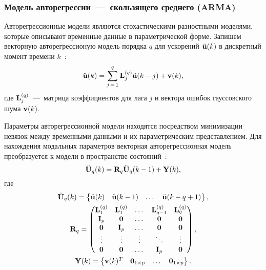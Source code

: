 \subsubsection{Модель авторегрессии~---~скользящего среднего (ARMA)}

Авторегрессионные модели являются стохастическими разностными моделями, которые описывают временные данные в параметрической форме. Запишем векторную авторегрессионую модель порядка $ q $ для ускорений $ \ddot{\mathbf{u}}(k) $ в дискретный момент времени $ k $~\cite{lib:oma:Chen}:
\begin{equation}
	\ddot{\mathbf{u}}(k) = \sum_{j\,=\,1} ^ q \mathbf{L}_j^{(q)} \ddot{\mathbf{u}}(k - j) + \mathbf{v}(k),
\end{equation}
где $ \mathbf{L}_j^{(q)} $~---~матрица коэффициентов для лага $ j $ и вектора ошибок гауссовского шума $ \mathbf{v}(k) $. 

Параметры авторегрессионной модели находятся посредством минимизации невязок между временными данными и их параметрическим представлением. Для нахождения модальных параметров векторная авторегрессионная модель преобразуется к модели в пространстве состояний~\cite{lib:oma:Pandit}:
\begin{equation}
	\ddot{\mathbf{U}}_q(k) = \mathbf{R}_q \ddot{\mathbf{U}}_q(k - 1) + \mathbf{Y}(k),
\end{equation} 
где 
\begingroup
\allowdisplaybreaks
\begin{gather}
	\ddot{\mathbf{U}}_q(k) = \begin{Bmatrix} \ddot{\mathbf{u}}(k) & \ddot{\mathbf{u}}(k - 1) & \dots & \ddot{\mathbf{u}}(k - q + 1) \end{Bmatrix}, \\
	\mathbf{R}_q = 
	\begin{pmatrix}
		\mathbf{L}_1^{(q)} & \mathbf{L}_1^{(q)} & \dots & \mathbf{L}_{q-1}^{(q)} & \mathbf{L}_q^{(q)} \\
		\mathbf{I}_p & \mathbf{0} & \dots & \mathbf{0} & \mathbf{0} \\ 
		\mathbf{0} & \mathbf{I}_p & \dots & \mathbf{0} & \mathbf{0} \\ 
		\vdots & \vdots & \vdots & \ddots & \vdots \\ 
		\mathbf{0} & \mathbf{0} & \dots & \mathbf{I}_p & \mathbf{0} 
	\end{pmatrix}, \\
	\mathbf{Y}(k) = \begin{Bmatrix} \mathbf{v}(k) ^ T & \mathbf{0}_{1 \times p} & \dots & \mathbf{0}_{1 \times p} \end{Bmatrix}.
\end{gather}
\endgroup


